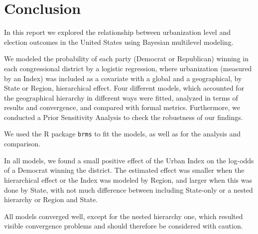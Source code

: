 \documentclass[12pt]{article}
\newcommand{\blue}[1]{\textcolor{blue}{#1}}
\begin{document}

\section{Conclusion}


In this report we explored the relationship between urbanization level and election outcomes in the United States using Bayesian multilevel modeling. 

We modeled the probability of each party (Democrat or Republican) winning in each congressional district by a logistic regression, where urbanization (measured by an Index) was included as a covariate with a global and a geographical, by State or Region, hierarchical effect. Four different models, which accounted for the geographical hierarchy in different ways were fitted, analyzed in terms of results and convergence, and compared with formal metrics. Furthermore, we conducted a Prior Sensitivity Analysis to check the robustness of our findings.

We used the R package \verb*|brms| to fit the models, as well as for the analysis and comparison.

In all models, we found a small positive effect of the Urban Index on the log-odds of a Democrat winning the district. The estimated effect was smaller when the hierarchical effect or the Index was modeled by Region, and larger when this was done by State, with not much difference between including State-only or a nested hierarchy or Region and State.

All models converged well, except for the nested hierarchy one, which resulted visible convergence problems and should therefore be considered with caution.
\end{document}
